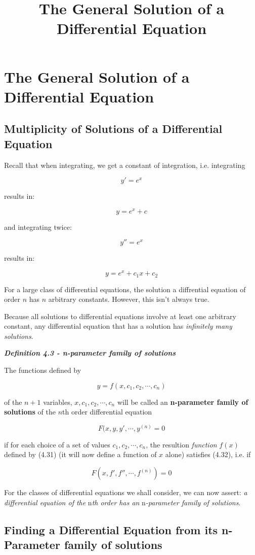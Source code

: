 \documentclass{article}
\title{The General Solution of a Differential Equation}
\begin{document}
\section{The General Solution of a Differential Equation}

\subsection{Multiplicity of Solutions of a Differential Equation}

Recall that when integrating, we get a constant of integration, i.e. integrating

\[ y' = e^x \]

results in:

\[ y = e^x + c \]

and integrating twice:

\[ y'' = e^x \]

results in: 

\[ y = e^x + c_1x + c_2 \]

For a large class of differential equations, the solution a diffrential equation of order $n$ has $n$ arbitrary constants. However, this isn't always true.

Because all solutions to differential equations involve at least one arbitrary constant, any differential equation that has a solution has \emph{infinitely many solutions}.

\emph{\textbf{Definition 4.3 - n-parameter family of solutions}}

The functions defined by 

\[ y = f(x,c_1,c_2,\cdots,c_n) \tag{4.31} \]

of the $n + 1$ variables, $x, c_1, c_2, \cdots, c_n$ will be called an \textbf{n-parameter family of solutions} of the $n$th order differential equation

\[ F(x,y,y',\cdots,y^{(n)} = 0 \tag{4.32} \] 

if for each choice of a set of values $c_1, c_2, \cdots, c_n$, the resultion \emph{function} $f(x)$ defined by (4.31) (it will now define a function of $x$ alone) satisfies (4.32), i.e. if

\[ F(x,f',f'',\cdots,f^{(n)}) = 0 \tag{4.33} \]

For the classes of differential equations we shall consider, we can now assert: \emph{a differential equation of the} n\emph{th order has an} n\emph{-parameter family of solutions}.

\subsection{Finding a Differential Equation from its n-Parameter family of solutions}
\end{document}
